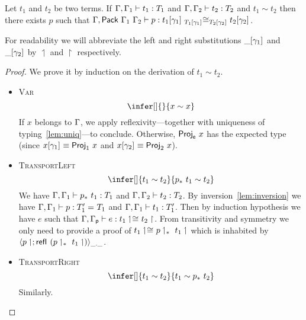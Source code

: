 \begin{lemma}
  Let $t_1$ and $t_2$ be two terms. If $\isterm{\Ga, \Ga_1}{t_1}{T_1}$ and
  $\isterm{\Ga, \Ga_2}{t_2}{T_2}$ and $t_1 \sim t_2$ then there exists $p$ such
  that
  $\isterm{\Ga, \Pack{\Ga_1}{\Ga_2}}
          {p}
          {\Heq{\llift{\gamma}{}{T_1}}
               {\llift{\gamma}{}{t_1}}
               {\rlift{\gamma}{}{T_2}}
               {\rlift{\gamma}{}{t_2}}}$.
\end{lemma}

For readability we will abbreviate the left and right substitutions
$\llift{\gamma}{}{\_}$ and $\rlift{\gamma}{}{\_}$ by $\upharpoonleft$
and $\upharpoonright$ respectively.

\begin{proof}
  We prove it by induction on the derivation of $t_1 \sim t_2$.

  \begin{itemize}
    \item \textsc{Var}
    \[
      \infer[]
        { }
        {x \sim x}
    \]
    If $x$ belongs to $\Ga$, we apply reflexivity---together with uniqueness of
    typing~\eqref{lem:uniq}---to conclude.
    Otherwise, $\ProjE{x}$ has the expected type (since
    $\llift{\gamma}{}{x} \equiv \ProjO{x}$ and $\rlift{\gamma}{}{x} \equiv \ProjT{x}$).

    \item \textsc{TransportLeft}
    \[
      \infer[]
        {t_1 \sim t_2}
        {\translpo{p}\ t_1 \sim t_2}
    \]
    We have $\isterm{\Ga, \Ga_1}{\translpo{p}\ t_1}{T_1}$ and
    $\isterm{\Ga, \Ga_2}{t_2}{T_2}$.
    By inversion~\eqref{lem:inversion} we have
    $\isterm{\Ga, \Ga_1}{p}{\Eq{}{T_1'}{T_1}}$ and
    $\isterm{\Ga, \Ga_1}{t_1}{T_1'}$.
    Then by induction hypothesis we have $e$ such that
    $\isterm{\Ga, \Gp}{e}{\Heq{}{\lo{t_1}}{}{\ro{t_2}}}$.
    From transitivity and symmetry we only need to provide a proof of
    $\Heq{}{\lo{t_1}}{}{\translpo{\lo{p}}\ \lo{t_1}}$ which is inhabited by
    $\pair{\_}{\_}{\lo{p}}{\refl{} (\translpo{\lo{p}}\ \lo{t_1})}$.

    \item \textsc{TransportRight}
    \[
      \infer[]
        {t_1 \sim t_2}
        {t_1 \sim \translpo{p}\ t_2}
    \]
    Similarly.


\end{itemize}
\end{proof}
